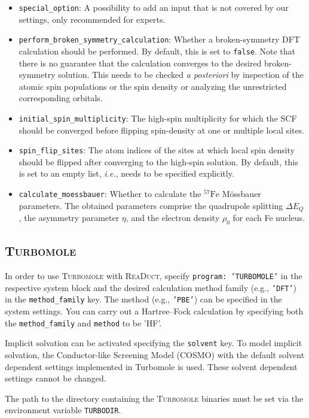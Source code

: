 \documentclass[]{tufte-book}
\begin{document}
\begin{itemize}
\item \texttt{special\_option}: A possibility to add an input that is not covered by our settings, only recommended for experts.
\item \texttt{perform\_broken\_symmetry\_calculation}: Whether a broken-symmetry DFT calculation should be performed. By default, this is set to \texttt{false}. Note that there is no guarantee that the calculation converges to the desired broken-symmetry solution. This needs to be checked \textit{a posteriori} by inspection of the atomic spin populations or the spin density or analyzing the unrestricted corresponding orbitals.
\item \texttt{initial\_spin\_multiplicity}: The high-spin multiplicity for which the SCF should be converged before flipping spin-density at one or multiple local sites.
\item \texttt{spin\_flip\_sites}: The atom indices of the sites at which local spin density should be flipped after converging to the high-spin solution. By default, this is set to an empty list, \textit{i.e.}, needs to be specified explicitly.
\item \texttt{calculate\_moessbauer}: Whether to calculate the $\mathrm{^{57}Fe}$ M\"ossbauer parameters. The obtained parameters comprise the quadrupole splitting $\Delta E_Q$, the asymmetry parameter $\eta$, and the electron density $\rho_0$ for each Fe nucleus.
\end{itemize}

\subsection{\textsc{Turbomole}}

In order to use \textsc{Turbomole} with \textsc{ReaDuct}, specify \texttt{program: 'TURBOMOLE'} in the respective system block and the desired
calculation method family (e.g., \texttt{'DFT'}) in the \texttt{method\_family} key.
The method (e.g., \texttt{'PBE'}) can be specified in the system settings.
You can carry out a Hartree--Fock calculation by specifying both the \texttt{method\_family} and \texttt{method} to be 'HF'.

Implicit solvation can be activated specifying the \texttt{solvent} key.
To model implicit solvation, the Conductor-like Screening Model \cite{cosmo} (COSMO) with the default solvent dependent settings implemented in Turbomole is used.
These solvent dependent settings cannot be changed.

The path to the directory containing the \textsc{Turbomole} binaries must be set via the environment variable \texttt{TURBODIR}.
\end{document}
